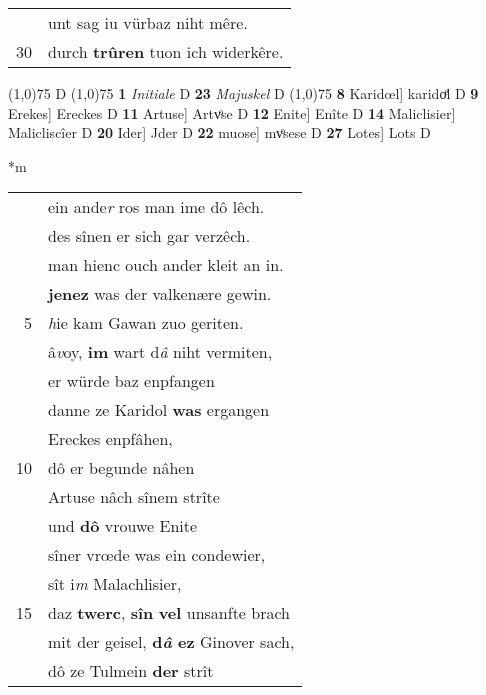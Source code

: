 \documentclass[8pt,a4paper,notitlepage]{article}
\begin{document}
\begin{table}[ht]
\begin{minipage}[t]{0.5\linewidth}
\begin{tabular}{rl}
 & unt sag iu vürbaz niht mêre.\\ 
30 & durch \textbf{trûren} tuon ich widerkêre.\\ 
\end{tabular}
\scriptsize
\line(1,0){75} \newline
D \newline
\line(1,0){75} \newline
\textbf{1} \textit{Initiale} D  \textbf{23} \textit{Majuskel} D  \newline
\line(1,0){75} \newline
\textbf{8} Karidœl] karidoͤl D \textbf{9} Erekes] Ereckes D \textbf{11} Artuse] Artvͦse D \textbf{12} Enite] Enîte D \textbf{14} Maliclisier] Malicliscîer D \textbf{20} Ider] Jder D \textbf{22} muose] mvͦsese D \textbf{27} Lotes] Lots D \newline
\end{minipage}
\hspace{0.5cm}
\begin{minipage}[t]{0.5\linewidth}
\small
\begin{center}*m
\end{center}
\begin{tabular}{rl}
 & ein ande\textit{r} ros man ime dô lêch.\\ 
 & des sînen er sich gar verzêch.\\ 
 & man hienc ouch ander kleit an in.\\ 
 & \textbf{jenez} was der valkenære gewin.\\ 
5 & \textit{h}ie kam Gawan zuo geriten.\\ 
 & â\textit{v}oy, \textbf{im} wart d\textit{â} niht vermiten,\\ 
 & er würde baz enpfangen\\ 
 & danne ze Karidol \textbf{was} ergangen\\ 
 & Ereckes enpfâhen,\\ 
10 & dô er begunde nâhen\\ 
 & Artuse nâch sînem strîte\\ 
 & und \textbf{dô} vrouwe Enite\\ 
 & sîner vrœde was ein condewier,\\ 
 & sît i\textit{m} Malachlisier,\\ 
15 & daz \textbf{twerc}, \textbf{sîn} \textbf{vel} unsanfte brach\\ 
 & mit der geisel, \textbf{d\textit{â} ez} Ginover sach,\\ 
 & dô ze Tulmein \textbf{der} strît\\ 

\end{tabular}
\end{minipage}
\end{table}
\end{document}
